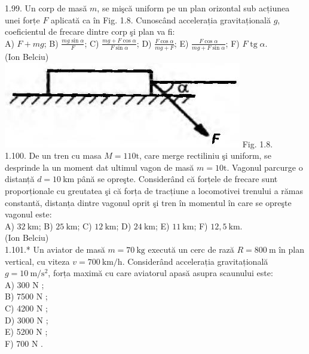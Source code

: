 \documentclass[10pt]{article}
\begin{document}
1.99. Un corp de masă $m$, se mişcă uniform pe un plan orizontal sub acțiunea unei forțe $F$ aplicată ca în Fig. 1.8. Cunoscând accelerația gravitațională $g$, coeficientul de frecare dintre corp şi plan va fi:\\ A) $F+m g$; B) $\frac{m g \sin \alpha}{F}$; C) $\frac{m g+F \cos \alpha}{F \sin \alpha}$; D) $\frac{F \cos \alpha}{m g+F}$; E) $\frac{F \cos \alpha}{m g+F \sin \alpha}$; F) $F \operatorname{tg} \alpha$.\\ (Ion Belciu)\\ \includegraphics[max width=\textwidth, center]{2025_07_01_5b3ff9fa0d508c8e9f17g-024} Fig. 1.8.\\

1.100. De un tren cu masa $M=110 \mathrm{t}$, care merge rectiliniu şi uniform, se desprinde la un moment dat ultimul vagon de masă $m=10 \mathrm{t}$. Vagonul parcurge o distanță $d=10 \mathrm{~km}$ până se opreşte. Considerând că forțele de frecare sunt proporționale cu greutatea şi că forța de tracțiune a locomotivei trenului a rămas constantă, distanța dintre vagonul oprit şi tren în momentul în care se opreşte vagonul este:\\ A) $32 \mathrm{~km}$; B) $25 \mathrm{~km}$; C) $12 \mathrm{~km}$; D) $24 \mathrm{~km}$; E) $11 \mathrm{~km}$; F) $12,5 \mathrm{~km}$.\\ (Ion Belciu)\\

1.101.* Un aviator de masă $m=70 \mathrm{~kg}$ execută un cerc de rază $R=800 \mathrm{~m}$ în plan vertical, cu viteza $v=700 \mathrm{~km} / \mathrm{h}$. Considerând accelerația gravitațională $g=10 \mathrm{~m} / \mathrm{s}^{2}$, forța maximă cu care aviatorul apasă asupra scaunului este:\\
A) 300 N ;\\
B) 7500 N ;\\
C) 4200 N ;\\
D) 3000 N ;\\
E) 5200 N ;\\
F) 700 N .
\end{document}
